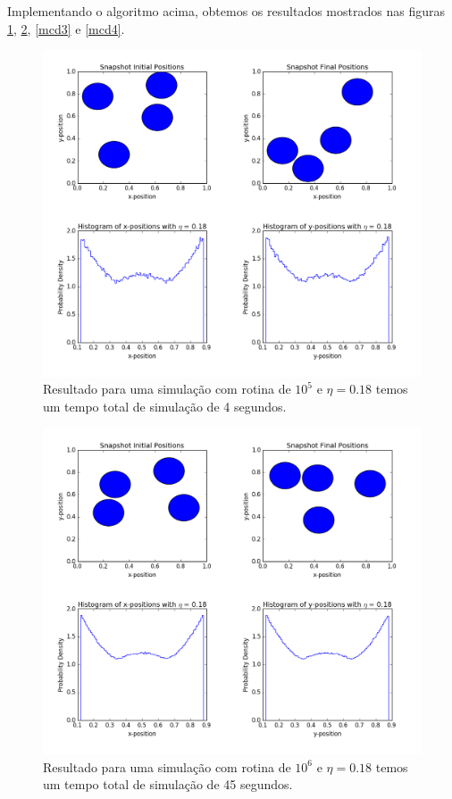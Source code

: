\documentclass[%
reprint,
amsmath,amssymb,
aps,
12pt
]{revtex4-1}
\begin{document}
Implementando o algoritmo acima, obtemos os resultados mostrados nas figuras \ref{mcd1}, \ref{mcd2}, \ref{mcd3} e \ref{mcd4}.
 

\begin{figure}[!h]
	\centering
	\includegraphics[scale=0.28]{mcd1.png}
	\caption{Resultado para uma simulação com rotina de $ 10^5 $ e $ \eta = 0.18 $ temos um tempo total de simulação de 4 segundos.
	\label{mcd1}}
\end{figure}
\begin{figure}[!h]
	\centering
	\includegraphics[scale=0.28]{mcd2.png}
	\caption{Resultado para uma simulação com rotina de $ 10^6 $ e $ \eta = 0.18 $ temos um tempo total de simulação de 45 segundos.
		\label{mcd2}}
\end{figure}
\end{document}
